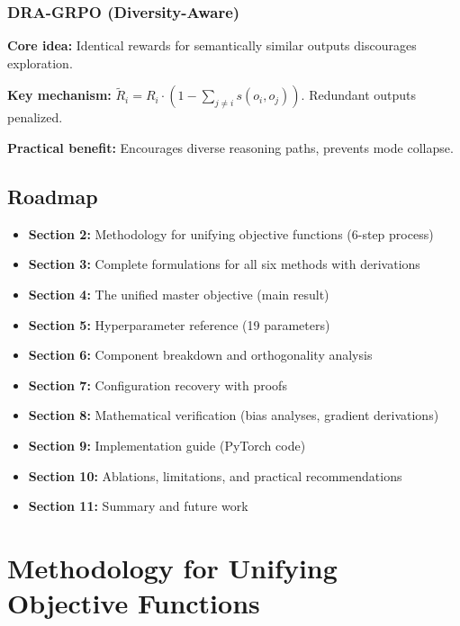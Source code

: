 \documentclass[11pt,a4paper]{article}
\begin{document}
\subsubsection{DRA-GRPO (Diversity-Aware)}
\begin{keyinsightbox}
\textbf{Core idea:} Identical rewards for semantically similar outputs discourages exploration.

\textbf{Key mechanism:} $\tilde{R}_i = R_i \cdot (1 - \sum_{j \neq i} s(o_i, o_j))$. Redundant outputs penalized.

\textbf{Practical benefit:} Encourages diverse reasoning paths, prevents mode collapse.
\end{keyinsightbox}

\subsection{Roadmap}

\begin{itemize}
    \item \textbf{Section 2:} Methodology for unifying objective functions (6-step process)
    \item \textbf{Section 3:} Complete formulations for all six methods with derivations
    \item \textbf{Section 4:} The unified master objective (main result)
    \item \textbf{Section 5:} Hyperparameter reference (19 parameters)
    \item \textbf{Section 6:} Component breakdown and orthogonality analysis
    \item \textbf{Section 7:} Configuration recovery with proofs
    \item \textbf{Section 8:} Mathematical verification (bias analyses, gradient derivations)
    \item \textbf{Section 9:} Implementation guide (PyTorch code)
    \item \textbf{Section 10:} Ablations, limitations, and practical recommendations
    \item \textbf{Section 11:} Summary and future work
\end{itemize}

\newpage


\section{Methodology for Unifying Objective Functions}
\end{document}
